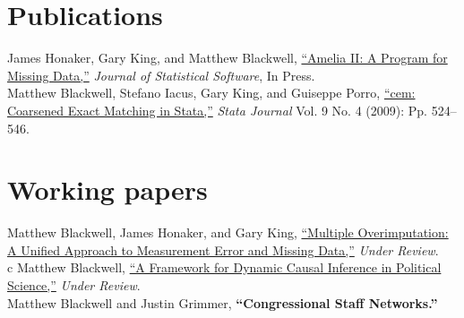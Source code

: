 \documentclass[margin,line]{res}
\newenvironment{list1}{
  \begin{list}{\ding{113}}{%
      \setlength{\itemsep}{0in}
      \setlength{\parsep}{0in} \setlength{\parskip}{0in}
      \setlength{\topsep}{0in} \setlength{\partopsep}{0in} 
      \setlength{\leftmargin}{0.83 cm}}}{\end{list}}
\begin{document}
\begin{resume}
\section{\sc Publications}

James Honaker, Gary King, and Matthew Blackwell, \href{http://www.mattblackwell.org/files/papers/amelia-jss.pdf}{``Amelia II: A
Program for Missing Data,''} \emph{Journal of Statistical Software},
In Press. 
\vspace{1em}\\
Matthew Blackwell, Stefano Iacus, Gary King, and Guiseppe Porro, \href{http://www.mattblackwell.org/files/papers/cemStata.pdf}{``cem: Coarsened Exact Matching in Stata,''} \emph{Stata
  Journal} Vol. 9 No. 4 (2009): Pp. 524--546.

\section{\sc Working papers}

Matthew Blackwell, James Honaker, and Gary King, \href{http://gking.harvard.edu/files/measure.pdf}{``Multiple Overimputation: A Unified Approach to Measurement Error and
Missing Data,''} \emph{Under Review}.\vspace{1em}\\
c%
Matthew Blackwell, \href{http://mattblackwell.org/files/papers/dynci.pdf}{``A Framework for Dynamic Causal Inference in Political Science,''} \emph{Under Review}.\vspace{1em}\\
Matthew Blackwell and Justin Grimmer, {\bf ``Congressional Staff Networks.''}



\end{resume}
\end{document}
